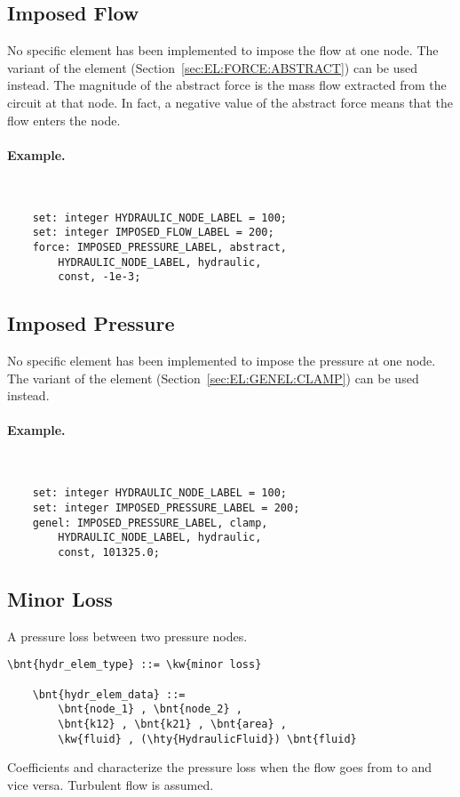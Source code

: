 \subsection{Imposed Flow}
\label{sec:EL:HYDR:IMPOSED_FLOW}
No specific element has been implemented to impose the flow at one node.
The  variant of the  element
(Section~\ref{sec:EL:FORCE:ABSTRACT}) can be used instead.
The magnitude of the abstract force is the mass flow extracted
from the circuit at that node.
In fact, a negative value of the abstract force means that the flow enters
the node.

\paragraph{Example.} \
\begin{verbatim}
    set: integer HYDRAULIC_NODE_LABEL = 100;
    set: integer IMPOSED_FLOW_LABEL = 200;
    force: IMPOSED_PRESSURE_LABEL, abstract,
        HYDRAULIC_NODE_LABEL, hydraulic,
        const, -1e-3;
\end{verbatim}



\subsection{Imposed Pressure}
\label{sec:EL:HYDR:IMPOSED_PRESSURE}
No specific element has been implemented to impose the pressure at one node.
The \kw{clamp} variant of the \kw{genel} element
(Section~\ref{sec:EL:GENEL:CLAMP}) can be used instead.

\paragraph{Example.} \
\begin{verbatim}
    set: integer HYDRAULIC_NODE_LABEL = 100;
    set: integer IMPOSED_PRESSURE_LABEL = 200;
    genel: IMPOSED_PRESSURE_LABEL, clamp,
        HYDRAULIC_NODE_LABEL, hydraulic,
        const, 101325.0;
\end{verbatim}




\subsection{Minor Loss}
A pressure loss between two pressure nodes.
\label{sec:EL:HYDR:MINOR_LOSS}
\begin{Verbatim}[commandchars=\\\{\}]
    \bnt{hydr_elem_type} ::= \kw{minor loss}

    \bnt{hydr_elem_data} ::=
        \bnt{node_1} , \bnt{node_2} ,
        \bnt{k12} , \bnt{k21} , \bnt{area} ,
        \kw{fluid} , (\hty{HydraulicFluid}) \bnt{fluid}
\end{Verbatim}
Coefficients  and  characterize the pressure loss
when the flow goes from  to  and vice versa.
Turbulent flow is assumed.



